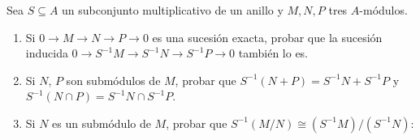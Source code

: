 \documentclass[twoside]{article}
\begin{document}
\newpage

\begin{ejercicio}{4}
Sea $S \subseteq A$ un subconjunto multiplicativo de un anillo y $M, N, P$ tres $A$-módulos.
\begin{enumerate}
	\item Si $0 \to M \to N \to P \to 0$ es una sucesión exacta, probar que la sucesión inducida $0 \to S^{-1}M \to S^{-1}N \to S^{-1}P \to 0$ también lo es.
	\item Si $N$, $P$ son submódulos de $M$, probar que $S^{-1}(N+P) = S^{-1}N+S^{-1}P$ y $S^{-1}(N \cap P) = S^{-1}N \cap S^{-1}P$.
	\item Si $N$ es un submódulo de $M$, probar que $S^{-1}(M/N) \cong (S^{-1}M)/(S^{-1}N)$:
\end{enumerate}
\end{ejercicio}
\end{document}
